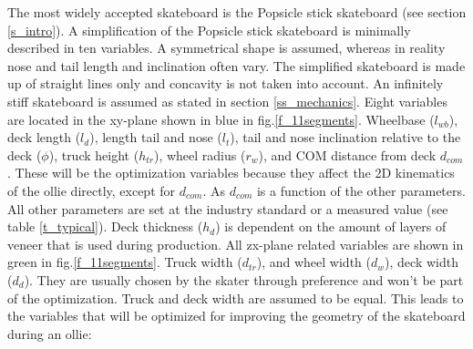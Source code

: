\noindent The most widely accepted skateboard is the Popsicle stick skateboard (see section \ref{s_intro}). A simplification of the Popsicle stick skateboard is minimally described in ten variables. A symmetrical shape is assumed, whereas in reality nose and tail length and inclination often vary. The simplified skateboard is made up of straight lines only and concavity is not taken into account. An infinitely stiff skateboard is assumed as stated in section \ref{ss_mechanics}. Eight variables are located in the xy-plane shown in blue in fig.\ref{f_11segments}. Wheelbase ($l_{wb}$), deck length ($l_{d}$), length tail and nose ($l_{t}$), tail and nose inclination relative to the deck ($\phi$), truck height ($h_{tr}$), wheel radius ($r_{w}$), and COM distance from deck $d_{com}$. These will be the optimization variables because they affect the 2D kinematics of the ollie directly, except for $d_{com}$. As $d_{com}$ is a function of the other parameters. All other parameters are set at the industry standard or a measured value (see table \ref{t_typical}). Deck thickness ($h_d$) is dependent on the amount of layers of veneer that is used during production. All zx-plane related variables are shown in green in fig.\ref{f_11segments}. Truck width ($d_{tr}$), and wheel width ($d_w$), deck width ($d_d$). They are usually chosen by the skater through preference and won't be part of the optimization. Truck and deck width are assumed to be equal. This leads to the variables that will be optimized for improving the geometry of the skateboard during an ollie:
\begin{equation}
    [l_{wb},\ l_d,\ l_t,\ \phi,\ h_{tr},\ r_w ]
\end{equation}

